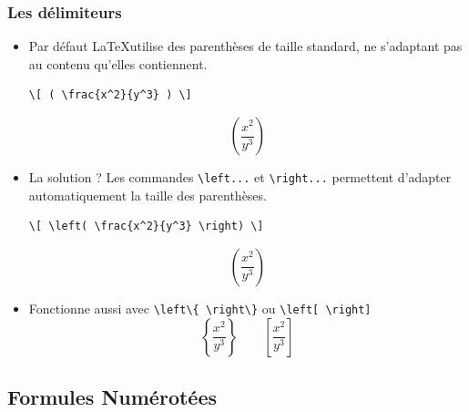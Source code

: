 \begin{frame}[fragile]
  \frametitle{Les délimiteurs}
  \begin{itemize}
      \item Par défaut \LaTeX utilise des parenthèses de taille standard, ne s'adaptant pas au contenu qu'elles contiennent.
      \begin{lstlisting}[style=nonumbers]
\[ ( \frac{x^2}{y^3} ) \]
\end{lstlisting}
\[ (\frac{x^2}{y^3}) \]
      \item La solution ? Les commandes \lstinline|\left...| et \lstinline|\right...| permettent d'adapter automatiquement la taille des parenthèses.
      \begin{lstlisting}[style=nonumbers]
\[ \left( \frac{x^2}{y^3} \right) \]
\end{lstlisting}
\[ \left( \frac{x^2}{y^3} \right) \]
      \item Fonctionne aussi avec \lstinline|\left\{ \right\}| ou \lstinline|\left[ \right]|
\[ \left\{\frac{x^2}{y^3}\right\} \qquad \left[\frac{x^2}{y^3}\right] \]
  \end{itemize}
\end{frame}

\subsection{Formules Numérotées}

